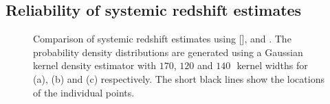 \subsection{Reliability of systemic redshift estimates}
\label{sec:ch4_redshifts}

\begin{figure}
   \captionsetup[subfigure]{labelformat=empty}
    \centering
    \subfloat[\label{fig:redshift_comparison_a}]{}
    \subfloat[\label{fig:redshift_comparison_b}]{}
    \subfloat[\label{fig:redshift_comparison_c}]{}
    \caption[{Comparison of systemic redshift estimates using [], \hb and \hans.}]{Comparison of systemic redshift estimates using [], \hb and \hans. The probability density distributions are generated using a Gaussian kernel density estimator with $170$, $120$ and $140$\,\kms\, kernel widths for (a), (b) and (c) respectively. The short black lines show the locations of the individual points.}       
    \label{fig:redshift_comparison}
\end{figure}

